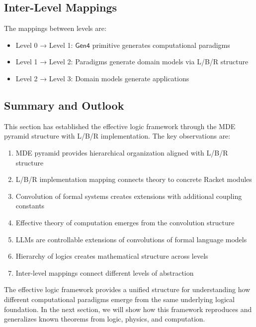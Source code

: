 \subsection{Inter-Level Mappings}

\begin{definition}
\label{def:inter-level-mappings}
The mappings between levels are:
\begin{itemize}
\item Level 0 → Level 1: $\mathsf{Gen4}$ primitive generates computational paradigms
\item Level 1 → Level 2: Paradigms generate domain models via L/B/R structure
\item Level 2 → Level 3: Domain models generate applications
\end{itemize}
\end{definition}

\subsection{Summary and Outlook}

This section has established the effective logic framework through the MDE pyramid structure with L/B/R implementation. The key observations are:

\begin{enumerate}
\item MDE pyramid provides hierarchical organization aligned with L/B/R structure
\item L/B/R implementation mapping connects theory to concrete Racket modules
\item Convolution of formal systems creates extensions with additional coupling constants
\item Effective theory of computation emerges from the convolution structure
\item LLMs are controllable extensions of convolutions of formal language models
\item Hierarchy of logics creates mathematical structure across levels
\item Inter-level mappings connect different levels of abstraction
\end{enumerate}

The effective logic framework provides a unified structure for understanding how different computational paradigms emerge from the same underlying logical foundation. In the next section, we will show how this framework reproduces and generalizes known theorems from logic, physics, and computation.
